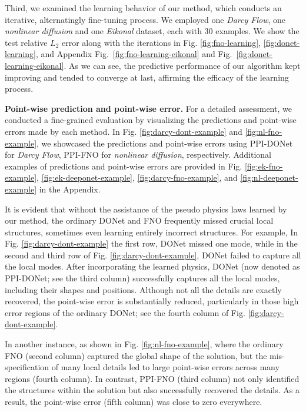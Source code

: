 Third, we examined the learning behavior of our method, which conducts an iterative, alternatingly fine-tuning process. We employed one \textit{Darcy Flow}, one \textit{nonlinear diffusion} and one \textit{Eikonal} dataset, each with 30 examples. We show the test relative $L_2$ error along with the iterations in Fig. \ref{fig:fno-learning}, \ref{fig:donet-learning}, and Appendix Fig.~\ref{fig:fno-learning-eikonal} and Fig.~\ref{fig:donet-learning-eikonal}. As we can see, the predictive performance of our algorithm kept improving and tended to converge at last, affirming the efficacy of the learning process. 


\noindent\textbf{Point-wise prediction and point-wise error.} For a detailed assessment, we conducted a fine-grained evaluation by visualizing the predictions and point-wise errors made by each method. In Fig. \ref{fig:darcy-dont-example} and \ref{fig:nl-fno-example},  we showcased the predictions and point-wise errors using PPI-DONet for \textit{Darcy Flow}, PPI-FNO for \textit{nonlinear diffusion}, respectively. Additional examples of predictions and point-wise errors are provided in Fig. \ref{fig:ek-fno-example}, \ref{fig:ek-deeponet-example}, \ref{fig:darcy-fno-example}, and \ref{fig:nl-deeponet-example} in the Appendix.
 
It is evident that without the assistance of the pseudo physics laws learned by our method, the ordinary DONet and FNO frequently missed crucial local structures, sometimes even learning entirely incorrect structures.
For example, In Fig. \ref{fig:darcy-dont-example} the first row, DONet missed one mode, while in the second and third row of Fig. \ref{fig:darcy-dont-example}, DONet failed to capture all the local modes. 
After incorporating the learned physics, DONet (now denoted as PPI-DONet; see the third column) successfully captures all the local modes, including their shapes and positions. Although not all the details are exactly recovered, the point-wise error is substantially reduced, particularly in those high error regions of the ordinary DONet; see the fourth column of Fig. \ref{fig:darcy-dont-example}.

In another instance, as shown in Fig. \ref{fig:nl-fno-example}, where the ordinary FNO (second column) captured the global shape of the solution, but the mis-specification of many local details led to large point-wise errors across many regions (fourth column). In contrast, PPI-FNO (third column) not only identified the structures within the solution but also successfully recovered the details. As a result, the point-wise error (fifth column) was close to zero everywhere.

